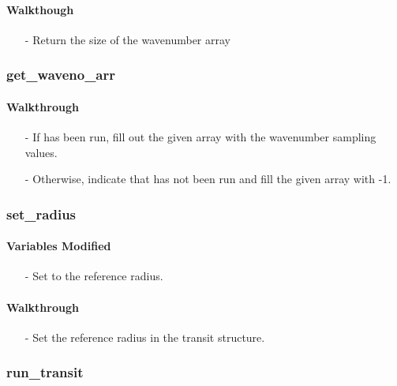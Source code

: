 \documentclass[letterpaper,12pt]{article}
\begin{document}
\paragraph{Walkthough}
\begin{enumerate}[leftmargin=10pt, noitemsep, parsep=0pt, topsep=0ex]
\item[-] Return the size of the wavenumber array
\end{enumerate}

\subsubsection{get\_waveno\_arr}
\paragraph{Walkthrough}
\begin{enumerate}[leftmargin=10pt, noitemsep, parsep=0pt, topsep=0ex]
\item[-] If  has been run, fill out the given array with the wavenumber sampling values.
\item[-] Otherwise, indicate that  has not been run and fill the given array with -1.
\end{enumerate}

\subsubsection{set\_radius}
\paragraph{Variables Modified}
\begin{enumerate}[leftmargin=10pt, noitemsep, parsep=0pt, topsep=0ex]
\item[-] Set  to the reference radius.
\end{enumerate}

\paragraph{Walkthrough}
\begin{enumerate}[leftmargin=10pt, noitemsep, parsep=0pt, topsep=0ex]
\item[-] Set the reference radius in the transit structure.
\end{enumerate}

\subsubsection{run\_transit}
\end{document}
